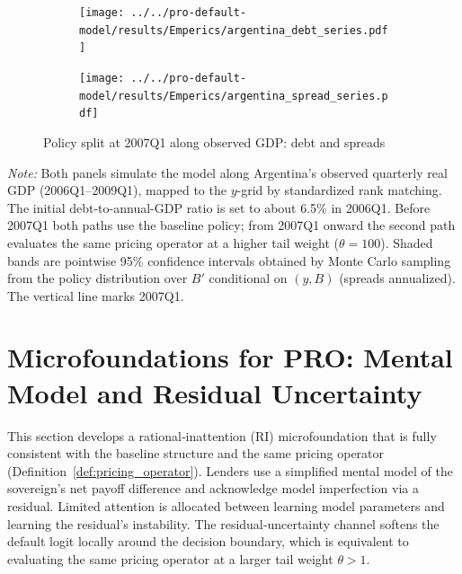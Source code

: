 \documentclass[12pt]{article}
\theoremstyle{plain}
\begin{document}
\begin{figure}[htbp]
	\centering
	\begin{subfigure}[t]{0.49\textwidth}
		\centering
		\texttt{[image: ../../pro-default-model/results/Emperics/argentina\_debt\_series.pdf]}
		\label{fig:arg_debt_series}
	\end{subfigure}\hfill
	\begin{subfigure}[t]{0.49\textwidth}
		\centering
		\texttt{[image: ../../pro-default-model/results/Emperics/argentina\_spread\_series.pdf]}
		\label{fig:arg_spread_series}
	\end{subfigure}
	\caption{Policy split at 2007Q1 along observed GDP: debt and spreads}
	\label{fig:argentina_policy_split}
\end{figure}

\parbox{\linewidth}{\small\textit{Note:} Both panels simulate the model along Argentina’s observed quarterly real GDP (2006Q1–2009Q1), mapped to the $y$-grid by standardized rank matching. The initial debt-to-annual-GDP ratio is set to about 6.5\% in 2006Q1. Before 2007Q1 both paths use the baseline policy; from 2007Q1 onward the second path evaluates the same pricing operator at a higher tail weight ($\theta=100$). Shaded bands are pointwise 95\% confidence intervals obtained by Monte Carlo sampling from the policy distribution over $B'$ conditional on $(y,B)$ (spreads annualized). The vertical line marks 2007Q1.}

\section{Microfoundations for PRO: Mental Model and Residual Uncertainty}\label{sec:micro}

This section develops a rational‑inattention (RI) microfoundation that is fully
consistent with the baseline structure and the same pricing operator
(Definition~\ref{def:pricing_operator}). Lenders use a simplified mental model
of the sovereign’s net payoff difference and acknowledge model imperfection via
a residual. Limited attention is allocated between learning model parameters
and learning the residual’s instability. The residual‑uncertainty channel
softens the default logit locally around the decision boundary, which is
equivalent to evaluating the same pricing operator at a larger tail weight
$\theta>1$.
\end{document}
